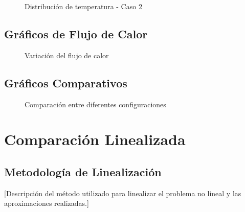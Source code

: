 \documentclass[12pt,letterpaper]{article}
\begin{document}
\begin{figure}[H]
    \centering
    \caption{Distribución de temperatura - Caso 2}
    \label{fig:temp_caso2}
\end{figure}

\subsection{Gráficos de Flujo de Calor}
\begin{figure}[H]
    \centering
    \caption{Variación del flujo de calor}
    \label{fig:flujo_calor}
\end{figure}

\subsection{Gráficos Comparativos}
\begin{figure}[H]
    \centering
    \caption{Comparación entre diferentes configuraciones}
    \label{fig:comparativo}
\end{figure}

\newpage
\section{Comparación Linealizada}

\subsection{Metodología de Linealización}
[Descripción del método utilizado para linealizar el problema no lineal y las aproximaciones realizadas.]
\end{document}
